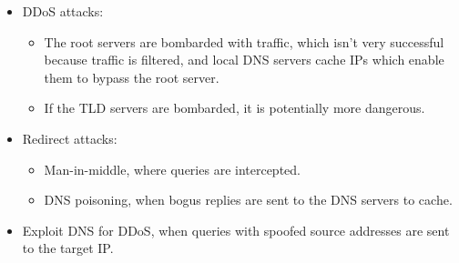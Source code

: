 \documentclass{article}
\begin{document}
\begin{itemize}
\item DDoS attacks:
\begin{itemize}
\item The root servers are bombarded with traffic, which isn't very successful because traffic is filtered, and local DNS servers cache IPs which enable them to bypass the root server.
\item If the TLD servers are bombarded, it is potentially more dangerous.
\end{itemize}
\item Redirect attacks:
\begin{itemize}
\item Man-in-middle, where queries are intercepted.
\item DNS poisoning, when bogus replies are sent to the DNS servers to cache.
\end{itemize}
\item Exploit DNS for DDoS, when queries with spoofed source addresses are sent to the target IP.
\end{itemize}
\end{document}
